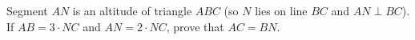 Segment $AN$ is an altitude of triangle $ABC$ (so $N$ lies on line $BC$ and $AN\perp BC$). If $AB=3\cdot NC$ and $AN=2\cdot NC$, prove that $AC=BN$.
